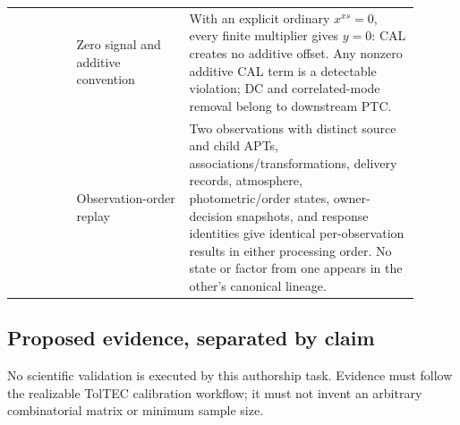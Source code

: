 \begin{longtable}{L{0.14\linewidth}L{0.25\linewidth}L{0.51\linewidth}}
 & Zero signal and additive convention & With an explicit
ordinary \(x^{xs}=0\), every finite multiplier gives \(y=0\): CAL creates no
additive offset. Any nonzero additive CAL term is a detectable violation; DC
and correlated-mode removal belong to downstream PTC. \\

 & Observation-order replay & Two observations with distinct source
and child APTs, associations/transformations, delivery records, atmosphere,
photometric/order states, owner-decision snapshots, and response identities
give identical per-observation results in either processing order. No state
or factor from one appears in the other's canonical lineage. \\

\bottomrule
\end{longtable}
\normalsize

\subsection{Proposed evidence, separated by claim}
\label{sec:validation-evidence}

No scientific validation is executed by this authorship task. Evidence must
follow the realizable TolTEC calibration workflow; it must not invent an
arbitrary combinatorial matrix or minimum sample size.

